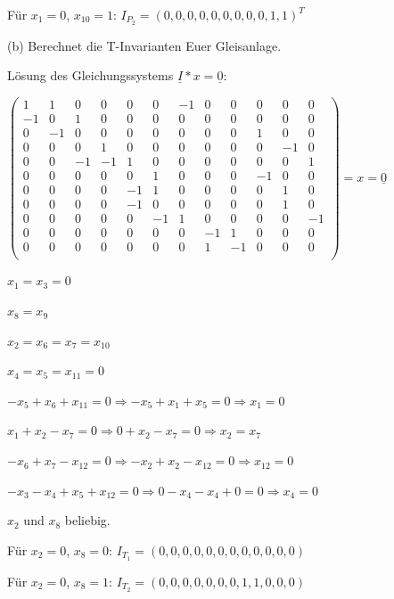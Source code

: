 \documentclass{scrreprt}
\begin{document}
\begin{enumerate}
\begin{enumerate}
Für \(x_1=0\), \(x_{10}=1\): \(I_{P_2} = (0, 0, 0, 0, 0, 0, 0, 0, 0, 1, 1)^T\)

\end{enumerate}

(b) Berechnet die T-Invarianten Euer Gleisanlage.

Lösung des Gleichungssystems \( \underline{I} * x = \underline{0} \):

\( \begin{pmatrix}
 1 & 1 & 0 & 0 & 0 & 0 &-1 & 0 & 0 & 0 & 0 & 0 \\
-1 & 0 & 1 & 0 & 0 & 0 & 0 & 0 & 0 & 0 & 0 & 0 \\
 0 &-1 & 0 & 0 & 0 & 0 & 0 & 0 & 0 & 1 & 0 & 0 \\
 0 & 0 & 0 & 1 & 0 & 0 & 0 & 0 & 0 & 0 &-1 & 0 \\
 0 & 0 &-1 &-1 & 1 & 0 & 0 & 0 & 0 & 0 & 0 & 1 \\
 0 & 0 & 0 & 0 & 0 & 1 & 0 & 0 & 0 &-1 & 0 & 0 \\
 0 & 0 & 0 & 0 &-1 & 1 & 0 & 0 & 0 & 0 & 1 & 0 \\
 0 & 0 & 0 & 0 &-1 & 0 & 0 & 0 & 0 & 0 & 1 & 0 \\
 0 & 0 & 0 & 0 & 0 &-1 & 1 & 0 & 0 & 0 & 0 &-1 \\
 0 & 0 & 0 & 0 & 0 & 0 & 0 &-1 & 1 & 0 & 0 & 0 \\
 0 & 0 & 0 & 0 & 0 & 0 & 0 & 1 &-1 & 0 & 0 & 0 \\
\end{pmatrix} = x = \underline{0} \)

\( x_1 = x_3 = 0 \)

\( x_8 = x_9 \)

\( x_2 = x_6 = x_7 = x_{10} \)

\( x_4 = x_5 = x_{11} = 0\)

\( -x_5 + x_6 + x_{11} = 0 \Rightarrow -x_5 + x_1 + x_5 = 0 \Rightarrow x_1 = 0 \)

\( x_1 + x_2 - x_7 = 0 \Rightarrow 0 + x_2 - x_7 = 0 \Rightarrow x_2 = x_7 \)

\( -x_6 + x_7 - x_{12} = 0 \Rightarrow -x_2 + x_2 - x_{12} = 0 \Rightarrow x_{12} = 0 \)

\( -x_3 - x_4 + x_5 + x_{12} = 0 \Rightarrow 0 - x_4 - x_4 + 0 = 0 \Rightarrow x_4 = 0 \)

\(x_2\) und \(x_8\) beliebig.

Für \(x_2=0\), \(x_8=0\): \(I_{T_1}=(0, 0, 0, 0, 0, 0, 0, 0, 0, 0, 0, 0)\)

Für \(x_2=0\), \(x_8=1\): \(I_{T_2}=(0, 0, 0, 0, 0, 0, 0, 1, 1, 0, 0, 0)\)


\end{enumerate}
\end{document}
